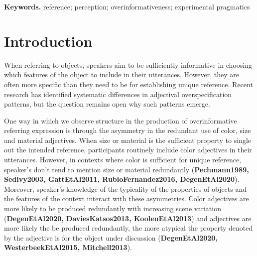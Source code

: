 \documentclass[12pt,letterpaper]{article}
\newcommand{\citeA}{\textbf}
\newenvironment{keywords}{%
\vspace{.5em}
\noindent\begin{minipage}{1\textwidth}
\setlength{\leftskip}{0.4in}
\setlength{\rightskip}{0.4in}
\textbf{Keywords.}}
{\end{minipage}}
\begin{document}
\begin{keywords} %
reference; perception; overinformativeness; experimental pragmatics
\end{keywords}

\section{Introduction} 
When referring to objects, speakers aim to be sufficiently informative in choosing which features of the object to include in their utterances. However, they are often more specific than they need to be for establishing unique reference. Recent research has identified systematic differences in adjectival overspecification patterns, but the question remains open why such patterns emerge.

One way in which we observe structure in the production of overinformative referring expression is through the asymmetry in the redundant use of color, size and material adjectives. When size or material is the sufficient property to single out the intended reference, participants routinely include color adjectives in their utterances. However, in contexts where color is sufficient for unique reference, speaker's don't tend to mention size or material redundantly (\citeA{Pechmann1989, Sedivy2003, GattEtAl2011, RubioFernandez2016, DegenEtAl2020}). Moreover, speaker's knowledge of the typicality of the properties of objects and the features of the context interact with these asymmetries. Color adjectives are more likely to be produced redundantly with increasing scene variation (\citeA{DegenEtAl2020, DaviesKatsos2013, KoolenEtAl2013}) and adjectives are more likely the be produced redundantly, the more atypical the property denoted by the adjective is for the object under discussion (\citeA{DegenEtAl2020, WesterbeekEtAl2015, Mitchell2013}).
\end{document}
